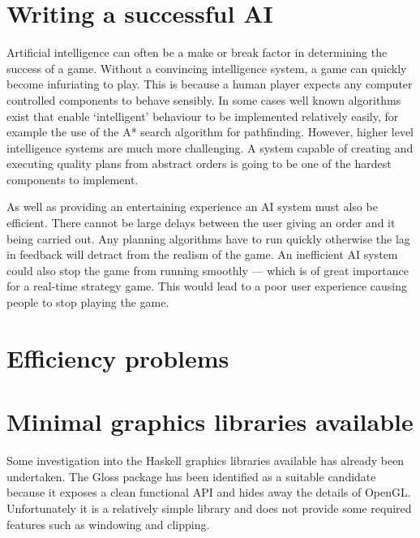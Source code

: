 \section{Writing a successful AI}

Artificial intelligence can often be a make or break factor in determining the success of
a game. Without a convincing intelligence system, a game can
quickly become infuriating to play. This is because a human player expects any computer
controlled components to behave sensibly. In some cases well known algorithms exist that
enable `intelligent' behaviour to be implemented relatively easily, for example the use
of the A* search algorithm for pathfinding. However, higher level intelligence systems
are much more challenging. A system capable of creating and executing quality plans
from abstract orders is going to be one of the hardest components to implement.

As well as providing an entertaining experience an AI system must also be efficient.
There cannot be large delays between the user giving an order and it being carried
out. Any planning algorithms have to run quickly otherwise the lag in feedback will
detract from the realism of the game. An inefficient AI system could also stop the game
from running smoothly --- which is of great importance for a real-time strategy game.
This would lead to a poor user experience causing people to stop playing the game.

\section{Efficiency problems}

\section{Minimal graphics libraries available}

Some investigation into the Haskell graphics libraries available has already been undertaken.
The Gloss package has been identified as a suitable candidate because it exposes a clean
functional API and hides away the details of OpenGL. Unfortunately it is a relatively simple
library and does not provide some required features such as windowing and clipping.
